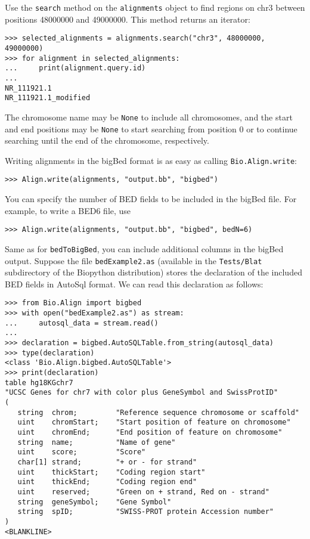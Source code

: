 Use the \verb|search| method on the \verb|alignments| object to find regions on chr3 between positions 48000000 and 49000000. This method returns an iterator:
\begin{verbatim}
>>> selected_alignments = alignments.search("chr3", 48000000, 49000000)
>>> for alignment in selected_alignments:
...     print(alignment.query.id)
...
NR_111921.1
NR_111921.1_modified
\end{verbatim}
The chromosome name may be \verb|None| to include all chromosomes, and the start and end positions may be \verb|None| to start searching from position 0 or to continue searching until the end of the chromosome, respectively.

Writing alignments in the bigBed format is as easy as calling \verb|Bio.Align.write|:
\begin{verbatim}
>>> Align.write(alignments, "output.bb", "bigbed")
\end{verbatim}
You can specify the number of BED fields to be included in the bigBed file. For example, to write a BED6 file, use
\begin{verbatim}
>>> Align.write(alignments, "output.bb", "bigbed", bedN=6)
\end{verbatim}
Same as for \verb|bedToBigBed|, you can include additional columns in the bigBed output. Suppose the file \verb|bedExample2.as| (available in the \verb|Tests/Blat| subdirectory of the Biopython distribution) stores the declaration of the included BED fields in AutoSql format. We can read this declaration as follows:
\begin{verbatim}
>>> from Bio.Align import bigbed
>>> with open("bedExample2.as") as stream:
...     autosql_data = stream.read()
...
>>> declaration = bigbed.AutoSQLTable.from_string(autosql_data)
>>> type(declaration)
<class 'Bio.Align.bigbed.AutoSQLTable'>
>>> print(declaration)
table hg18KGchr7
"UCSC Genes for chr7 with color plus GeneSymbol and SwissProtID"
(
   string  chrom;         "Reference sequence chromosome or scaffold"
   uint    chromStart;    "Start position of feature on chromosome"
   uint    chromEnd;      "End position of feature on chromosome"
   string  name;          "Name of gene"
   uint    score;         "Score"
   char[1] strand;        "+ or - for strand"
   uint    thickStart;    "Coding region start"
   uint    thickEnd;      "Coding region end"
   uint    reserved;      "Green on + strand, Red on - strand"
   string  geneSymbol;    "Gene Symbol"
   string  spID;          "SWISS-PROT protein Accession number"
)
<BLANKLINE>
\end{verbatim}
